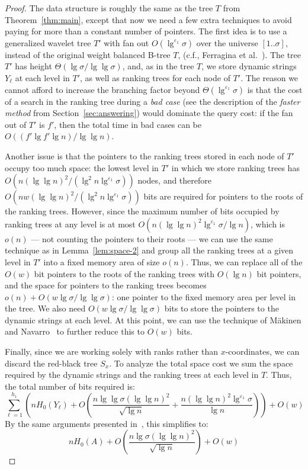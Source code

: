 \documentclass{llncs}
\begin{document}
\begin{proof}
  The data structure is roughly the same as the tree $T$ from
  Theorem~\ref{thm:main}, except that now we need a few extra
  techniques to avoid paying for more than a constant number of
  pointers.  The first idea is to use a generalized wavelet tree $T'$
  with fan out $O(\lg^{\varepsilon_1} \sigma)$ over the universe $[1
  ..\sigma]$, instead of the original weight balanced B-tree $T$,
  (c.f., Ferragina et al.~\cite{FMMN04}).  The tree $T'$ has height
  $\Theta(\lg \sigma / \lg \lg \sigma)$, and, as in the tree $T$, we
  store dynamic strings $Y_\ell$ at each level in $T'$, as well as
  ranking trees for each node of $T'$.  The reason we cannot afford to
  increase the branching factor beyond $\Theta(\lg^{\varepsilon_1}
  \sigma)$ is that the cost of a search in the ranking tree during a
  \emph{bad case} (see the description of the \emph{faster method}
  from Section~\ref{sec:answering}) would dominate the query cost: if
  the fan out of $T'$ is $f'$, then the total time in bad cases can be
  $O((f' \lg f' \lg n) / \lg \lg n)$.

  Another issue is that the pointers to the ranking trees stored in
  each node of $T'$ occupy too much space: the lowest level in $T'$ in
  which we store ranking trees has $O(n (\lg \lg n)^2/ (\lg^{2}n
  \lg^{\varepsilon_1}\sigma))$ nodes, and therefore $O(nw (\lg \lg
  n)^2/( \lg^{2}n \lg^{\varepsilon_1}\sigma))$ bits are required for
  pointers to the roots of the ranking trees.  However, since the
  maximum number of bits occupied by ranking trees at any level is at
  most $O\left( n(\lg \lg n)^2 \lg^{\varepsilon_1} \sigma / \lg n
  \right)$, which is $o(n)$ --- not counting the pointers to their
  roots --- we can use the same technique as in
  Lemma~\ref{lem:space-2} and group all the ranking trees at a given
  level in $T'$ into a fixed memory area of size $o(n)$.  Thus, we can
  replace all of the $O(w)$ bit pointers to the roots of the ranking
  trees with $O(\lg n)$ bit pointers, and the space for pointers to
  the ranking trees becomes $o(n) + O(w \lg \sigma / \lg \lg \sigma)$:
  one pointer to the fixed memory area per level in the tree.  We also
  need $O(w \lg \sigma / \lg \lg \sigma)$ bits to store the pointers
  to the dynamic strings at each level.  At this point, we can use the
  technique of M{\"a}kinen and Navarro~\cite{MN06} to further reduce
  this to $O(w)$ bits.

  Finally, since we are working solely with ranks rather than
  $x$-coordinates, we can discard the red-black tree $S_x$.  To
  analyze the total space cost we sum the space required by the
  dynamic strings and the ranking trees at each level in $T$.  Thus,
  the total number of bits required is:
$$\sum_{\ell = 1}^{h_1} \left(n H_0(Y_\ell) + O\left( \frac{n \lg \lg \sigma (\lg \lg n)^2}{\sqrt{\lg n}} + \frac{n (\lg \lg n)^2 \lg^{\varepsilon_1}\sigma}{\lg n}\right) \right) + O(w)$$
\noindent
By the same arguments presented in~\cite{FMMN04}, this simplifies to:
$$n H_0(A) + O\left(\frac{n \lg \sigma (\lg \lg n)^2}{\sqrt{\lg n}}\right) + O(w)$$
\end{proof}
\end{document}
